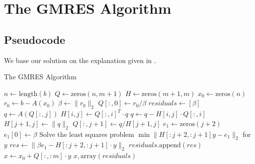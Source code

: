 \section{The GMRES Algorithm}

\subsection{Pseudocode}

We base our solution on the explanation given in \citet{gmres2025lab}.

\begin{algorithm}[H]
    \begin{algorithmic}
        \caption{The GMRES Algorithm}
        \State$n\gets\text{length}(b)$
        \State$Q\gets\text{zeros}(n,m+1)$
        \State$H\gets\text{zeros}(m+1,m)$
        \State$x_0\gets\text{zeros}(n)$
        \State$r_0\gets b-A(x_0)$
        \State$\beta\gets\|r_0\|_2$
        \State$Q[:,0]\gets r_0/\beta$
        \State$residuals\gets[\beta]$
        \State$q\gets A(Q[:,j])$
        \State$H[i,j]\gets Q[:,i]^T\cdot q$
        \State$q\gets q-H[i,j]\cdot Q[:,i]$
        \EndFor
        \State$H[j+1,j]\gets\|q\|_2$
        \State$Q[:,j+1]\gets q/H[j+1,j]$
        \State$e_1\gets\text{zeros}(j+2)$
        \State$e_1[0]\gets\beta$
        \State Solve the least squares problem $\min\|H[:j+2,:j+1]y-e_1\|_2$ for $y$
        \State$res\gets\|\beta e_1-H[:j+2,:j+1]\cdot y\|_2$
        \State$residuals.\text{append}(res)$
        \EndFor
        \State$x\gets x_0+Q[:,:m]\cdot y$
        \State\Return$x,\text{array}(residuals)$
        \EndProcedure
    \end{algorithmic}
\end{algorithm}
